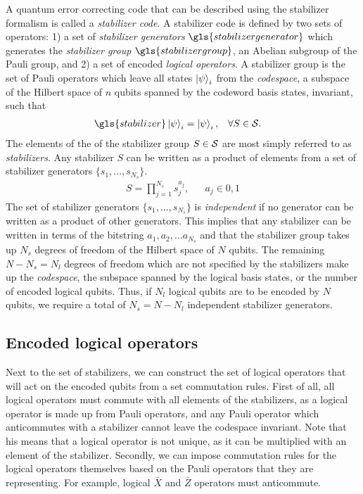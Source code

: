 A quantum error correcting code that can be described using the stabilizer formalism is called a \emph{stabilizer code}. A stabilizer code is defined by two sets of operators: 1) a set of \emph{stabilizer generators} $\gls{stabilizergenerator}$ which generates the \emph{stabilizer group} $\gls{stabilizergroup}$, an Abelian subgroup of the Pauli group, and 2) a set of encoded \emph{logical operators}. A stabilizer group is the set of Pauli operators which leave all states $\ket{\psi}_i$ from the \emph{codespace}, a subspace of the Hilbert space of $n$ qubits spanned by the codeword basis states, invariant, such that
\begin{align}
  & \gls{stabilizer}\ket{\psi}_i = \ket{\psi}_i, && \forall S \in \m{S}. &
\end{align}
The elements of the of the stabilizer group $S\in\mathcal{S}$ are most simply referred to as \emph{stabilizers}. Any stabilizer $S$ can be written as a product of elements from a set of stabilizer generators $\{s_1,...,s_{N_s}\}$.  
\begin{align}
 & S = \prod_{j=1}^{N_s}s_j^{a_j}, && a_j \in {0, 1} &
\end{align}
The set of stabilizer generators $\{s_1,...,s_{N_s}\}$ is \emph{independent} if no generator can be written as a product of other generators. This implies that any stabilizer can be written in terms of the bitstring $a_1, a_2, ...a_{N_s}$ and that the stabilizer group takes up $N_s$ degrees of freedom of the Hilbert space of $N$ qubits. The remaining $N-N_s = N_l$ degrees of freedom which are not specified by the stabilizers make up the \emph{codespace}, the subspace spanned by the logical basis states, or the number of encoded logical qubits. Thus, if $N_l$ logical qubits are to be encoded by $N$ qubits, we require a total of $N_s = N-N_l$ independent stabilizer generators.


\subsection{Encoded logical operators}

Next to the set of stabilizers, we can construct the set of logical operators that will act on the encoded qubits from a set commutation rules. First of all, all logical operators must commute with all elements of the stabilizers, as a logical operator is made up from Pauli operators, and any Pauli operator which anticommutes with a stabilizer cannot leave the codespace invariant. Note that his means that a logical operator is not unique, as it can be multiplied with an element of the stabilizer. Secondly, we can impose commutation rules for the logical operators themselves based on the Pauli operators that they are representing. For example, logical $\bar{X}$ and $\bar{Z}$ operators must anticommute.

